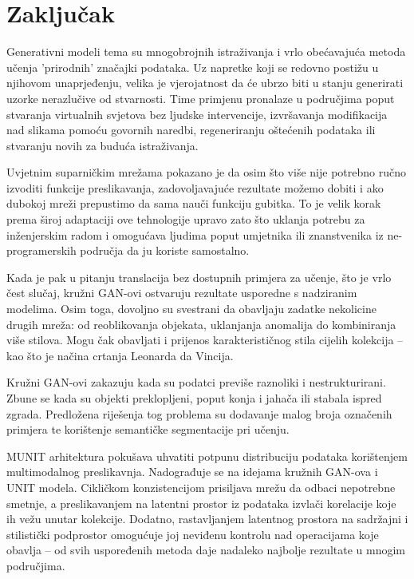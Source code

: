 \documentclass[lmodern, utf8, seminar]{fer}
\begin{document}


\chapter{Zaključak}
Generativni modeli tema su mnogobrojnih istraživanja i vrlo obećavajuća metoda učenja 'prirodnih' značajki podataka. Uz napretke koji se redovno postižu u njihovom unaprjeđenju, velika je vjerojatnost da će ubrzo biti u stanju generirati uzorke nerazlučive od stvarnosti. Time primjenu pronalaze u područjima poput stvaranja virtualnih svjetova bez ljudske intervencije, izvršavanja modifikacija nad slikama pomoću govornih naredbi, regeneriranju oštećenih podataka ili stvaranju novih za buduća istraživanja.
\newline

Uvjetnim suparničkim mrežama pokazano je da osim što više nije potrebno ručno izvoditi funkcije preslikavanja, zadovoljavajuće rezultate možemo dobiti i ako dubokoj mreži prepustimo da sama nauči funkciju gubitka. To je velik korak prema široj adaptaciji ove tehnologije upravo zato što uklanja potrebu za inženjerskim radom i omogućava ljudima poput umjetnika ili znanstvenika iz ne-programerskih područja da ju koriste samostalno.
\newline

Kada je pak u pitanju translacija bez dostupnih primjera za učenje, što je vrlo čest slučaj, kružni GAN-ovi ostvaruju rezultate usporedne s nadziranim modelima. Osim toga, dovoljno su svestrani da obavljaju zadatke nekolicine drugih mreža: od reoblikovanja objekata, uklanjanja anomalija do kombiniranja više stilova. Mogu čak obavljati i prijenos karakterističnog stila cijelih kolekcija -- kao što je načina crtanja Leonarda da Vincija. 

Kružni GAN-ovi zakazuju kada su podatci previše raznoliki i nestrukturirani. Zbune se kada su objekti preklopljeni, poput konja i jahača ili stabala ispred zgrada. Predložena riješenja tog problema su dodavanje malog broja označenih primjera te korištenje semantičke segmentacije pri učenju. 


\newpage
MUNIT arhitektura pokušava uhvatiti potpunu distribuciju podataka korištenjem multimodalnog preslikavnja. Nadograđuje se na idejama kružnih GAN-ova i UNIT modela. Cikličkom konzistencijom prisiljava mrežu da odbaci nepotrebne smetnje, a preslikavanjem na latentni prostor iz podataka izvlači korelacije koje ih vežu unutar kolekcije. Dodatno, rastavljanjem latentnog prostora na sadržajni i stilistički podprostor omogućuje joj neviđenu kontrolu nad operacijama koje obavlja -- od svih uspoređenih metoda daje nadaleko najbolje rezultate u mnogim područjima.
\end{document}
